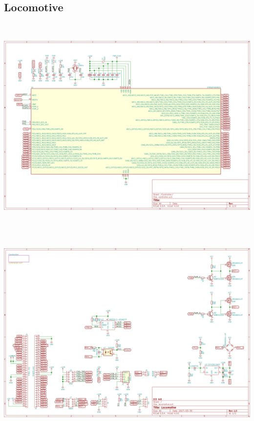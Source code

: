 \documentclass[openbib,letterpaper,10pt]{article}
\begin{document}
\begin{spacing}{1.15}
\begin{appendix}
\subsection{Locomotive}
\begin{center}
\includegraphics[height=30em]{../electronics/locomotive/images/locomotive-Controller.png}
\includegraphics[height=30em]{../electronics/locomotive/images/locomotive-sch.png}
\end{center}


\end{appendix}
\end{spacing}
\end{document}
